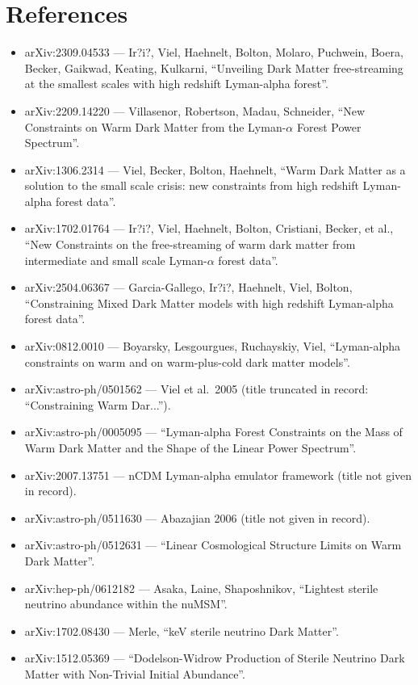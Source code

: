\documentclass[11pt,a4paper]{article}
\begin{document}
\section*{References}
\begin{itemize}
\item arXiv:2309.04533 --- Ir?i?, Viel, Haehnelt, Bolton, Molaro, Puchwein, Boera, Becker, Gaikwad, Keating, Kulkarni, ``Unveiling Dark Matter free-streaming at the smallest scales with high redshift Lyman-alpha forest''.
\item arXiv:2209.14220 --- Villasenor, Robertson, Madau, Schneider, ``New Constraints on Warm Dark Matter from the Lyman-$\alpha$ Forest Power Spectrum''.
\item arXiv:1306.2314 --- Viel, Becker, Bolton, Haehnelt, ``Warm Dark Matter as a solution to the small scale crisis: new constraints from high redshift Lyman-alpha forest data''.
\item arXiv:1702.01764 --- Ir?i?, Viel, Haehnelt, Bolton, Cristiani, Becker, et al., ``New Constraints on the free-streaming of warm dark matter from intermediate and small scale Lyman-$\alpha$ forest data''.
\item arXiv:2504.06367 --- Garcia-Gallego, Ir?i?, Haehnelt, Viel, Bolton, ``Constraining Mixed Dark Matter models with high redshift Lyman-alpha forest data''.
\item arXiv:0812.0010 --- Boyarsky, Lesgourgues, Ruchayskiy, Viel, ``Lyman-alpha constraints on warm and on warm-plus-cold dark matter models''.
\item arXiv:astro-ph/0501562 --- Viel et al.\ 2005 (title truncated in record: ``Constraining Warm Dar...'').
\item arXiv:astro-ph/0005095 --- ``Lyman-alpha Forest Constraints on the Mass of Warm Dark Matter and the Shape of the Linear Power Spectrum''.
\item arXiv:2007.13751 --- nCDM Lyman-alpha emulator framework (title not given in record).
\item arXiv:astro-ph/0511630 --- Abazajian 2006 (title not given in record).
\item arXiv:astro-ph/0512631 --- ``Linear Cosmological Structure Limits on Warm Dark Matter''.
\item arXiv:hep-ph/0612182 --- Asaka, Laine, Shaposhnikov, ``Lightest sterile neutrino abundance within the nuMSM''.
\item arXiv:1702.08430 --- Merle, ``keV sterile neutrino Dark Matter''.
\item arXiv:1512.05369 --- ``Dodelson-Widrow Production of Sterile Neutrino Dark Matter with Non-Trivial Initial Abundance''.

\end{itemize}
\end{document}
